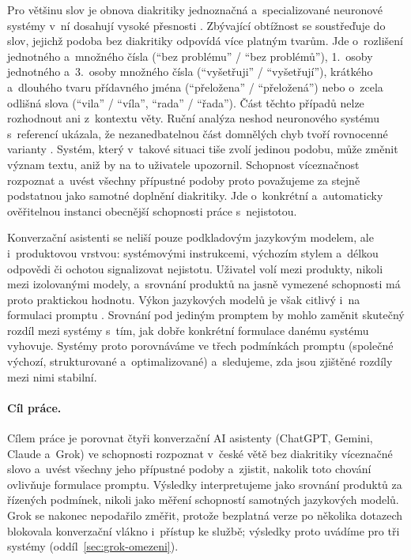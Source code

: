 \documentclass[11pt,a4paper]{article}
\begin{document}
Pro většinu slov je obnova diakritiky jednoznačná a~specializované
neuronové systémy v~ní dosahují vysoké přesnosti
\cite{naplava2018,naplava2021}. Zbývající obtížnost se soustřeďuje do
slov, jejichž podoba bez diakritiky odpovídá více platným tvarům. Jde
o~rozlišení jednotného a~množného čísla (\enquote{bez problému}
/ \enquote{bez problémů}), 1.~osoby jednotného a~3.~osoby množného čísla
(\enquote{vyšetřuji} / \enquote{vyšetřují}), krátkého a~dlouhého tvaru
přídavného jména (\enquote{přeložena} / \enquote{přeložená}) nebo
o~zcela odlišná slova (\enquote{vila} / \enquote{víla}, \enquote{rada}
/ \enquote{řada}). Část těchto případů nelze rozhodnout ani z~kontextu
věty. Ruční analýza neshod neuronového systému s~referencí ukázala, že
nezanedbatelnou část domnělých chyb tvoří rovnocenné varianty
\cite{naplava2021}. Systém, který v~takové situaci tiše zvolí jedinou
podobu, může změnit význam textu, aniž by na to uživatele upozornil.
Schopnost víceznačnost rozpoznat a~uvést všechny přípustné podoby proto
považujeme za stejně podstatnou jako samotné doplnění diakritiky. Jde
o~konkrétní a~automaticky ověřitelnou instanci obecnější schopnosti
práce s~nejistotou.

Konverzační asistenti se neliší pouze podkladovým jazykovým modelem,
ale i~produktovou vrstvou: systémovými instrukcemi, výchozím stylem
a~délkou odpovědi či ochotou signalizovat nejistotu. Uživatel volí mezi
produkty, nikoli mezi izolovanými modely, a~srovnání produktů na jasně
vymezené schopnosti má proto praktickou hodnotu. Výkon jazykových
modelů je však citlivý i~na formulaci promptu \cite{sclar2024,mizrahi2024}.
Srovnání pod jediným promptem by mohlo zaměnit skutečný rozdíl mezi
systémy s~tím, jak dobře konkrétní formulace danému systému vyhovuje.
Systémy proto porovnáváme ve třech podmínkách promptu (společné výchozí,
strukturované a~optimalizované) a~sledujeme, zda jsou zjištěné rozdíly
mezi nimi stabilní.

\paragraph{Cíl práce.}
Cílem práce je porovnat čtyři konverzační AI asistenty (ChatGPT, Gemini,
Claude a~Grok) ve schopnosti rozpoznat v~české větě bez diakritiky
víceznačné slovo a~uvést všechny jeho přípustné podoby a~zjistit,
nakolik toto chování ovlivňuje formulace promptu. Výsledky interpretujeme
jako srovnání produktů za řízených podmínek, nikoli jako měření
schopností samotných jazykových modelů. Grok se nakonec nepodařilo
změřit, protože bezplatná verze po několika dotazech blokovala
konverzační vlákno i~přístup ke službě; výsledky proto uvádíme pro
tři systémy (oddíl~\ref{sec:grok-omezeni}).
\end{document}
